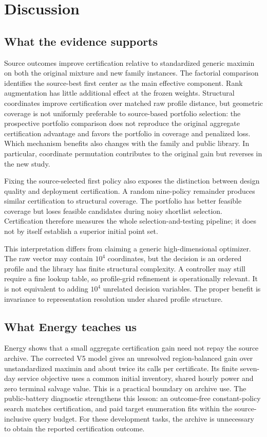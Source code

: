 \section{Discussion}\label{sec:discussion}

\subsection{What the evidence supports}

Source outcomes improve certification relative to standardized generic
maximin on both the original mixture and new family instances.  The factorial
comparison identifies the source-best first center as the main effective
component.  Rank augmentation has little additional effect at the frozen
weights.  Structural coordinates improve certification over matched raw
profile distance, but geometric coverage is not uniformly preferable to
source-based portfolio selection: the prospective portfolio comparison does
not reproduce the original aggregate certification advantage and favors the
portfolio in coverage and penalized loss.  Which mechanism benefits also
changes with the family and public library.  In particular, coordinate
permutation contributes to the original gain but reverses in the new study.

Fixing the source-selected first policy also exposes the distinction between
design quality and deployment certification.  A random nine-policy remainder
produces similar certification to structural coverage.  The portfolio has
better feasible coverage but loses feasible candidates during noisy shortlist
selection.  Certification therefore measures the whole selection-and-testing
pipeline; it does not by itself establish a superior initial point set.

This interpretation differs from claiming a generic high-dimensional
optimizer.  The raw vector may contain $10^4$ coordinates, but the decision is
an ordered profile and the library has finite structural complexity.  A
controller may still require a fine lookup table, so profile-grid refinement
is operationally relevant.  It is not equivalent to adding $10^4$ unrelated
decision variables.  The proper benefit is invariance to representation
resolution under shared profile structure.

\subsection{What Energy teaches us}

Energy shows that a small aggregate certification gain need not repay the
source archive.  The corrected V5 model gives an unresolved region-balanced
gain over unstandardized maximin and about twice its calls per certificate.
Its finite seven-day service objective uses a common initial inventory,
shared hourly power and zero terminal salvage value.  This is a practical
boundary on archive use.  The public-battery diagnostic strengthens this
lesson: an outcome-free constant-policy search matches certification, and
paid target enumeration fits within the source-inclusive query budget.
For these development tasks, the archive is unnecessary to obtain the
reported certification outcome.

